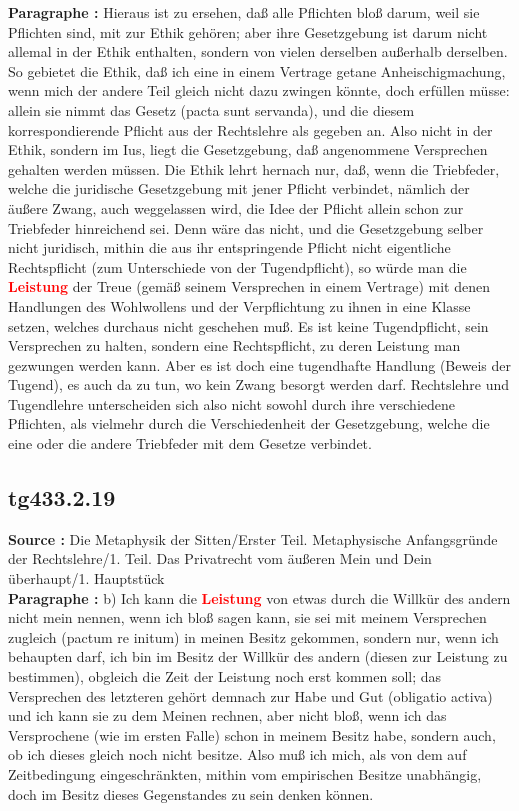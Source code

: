 \documentclass[a4paper,12pt,twoside]{book}
\newcommand{\match}[1]{\textcolor{red}{\textbf{#1}}}
\begin{document}
	\textbf{Paragraphe : }Hieraus ist zu ersehen, daß alle Pflichten bloß darum, weil sie Pflichten sind, mit zur Ethik gehören; aber ihre Gesetzgebung ist darum nicht allemal in der Ethik enthalten, sondern von vielen derselben außerhalb derselben. So gebietet die Ethik, daß ich eine in einem Vertrage getane Anheischigmachung, wenn mich der andere Teil gleich nicht dazu zwingen könnte, doch erfüllen müsse: allein sie nimmt das Gesetz (pacta sunt servanda), und die diesem korrespondierende Pflicht aus der Rechtslehre als gegeben an. Also nicht in der Ethik, sondern im Ius, liegt die Gesetzgebung, daß angenommene Versprechen gehalten werden müssen. Die Ethik lehrt hernach nur, daß, wenn die Triebfeder, welche die juridische Gesetzgebung mit jener Pflicht verbindet, nämlich der äußere Zwang, auch weggelassen wird, die Idee der Pflicht allein schon zur Triebfeder hinreichend sei. Denn wäre das nicht, und die Gesetzgebung selber nicht juridisch, mithin die aus ihr entspringende Pflicht nicht eigentliche Rechtspflicht (zum Unterschiede von der Tugendpflicht), so würde man die \match{Leistung} der Treue (gemäß seinem Versprechen in einem Vertrage) mit denen Handlungen des Wohlwollens und der Verpflichtung zu ihnen in eine Klasse setzen, welches durchaus nicht geschehen muß. Es ist keine Tugendpflicht, sein Versprechen zu halten, sondern eine Rechtspflicht, zu deren Leistung man gezwungen werden kann. Aber es ist doch eine tugendhafte Handlung (Beweis der Tugend), es auch da zu tun, wo kein Zwang besorgt werden darf. Rechtslehre und Tugendlehre unterscheiden sich also nicht sowohl durch ihre verschiedene Pflichten, als vielmehr durch die Verschiedenheit der Gesetzgebung, welche die eine oder die andere Triebfeder mit dem Gesetze verbindet. 
	
	\subsection*{tg433.2.19} 
	\textbf{Source : }Die Metaphysik der Sitten/Erster Teil. Metaphysische Anfangsgründe der Rechtslehre/1. Teil. Das Privatrecht vom äußeren Mein und Dein überhaupt/1. Hauptstück\\  
	
	\textbf{Paragraphe : }b) Ich kann die \match{Leistung} von etwas durch die Willkür des andern nicht mein nennen, wenn ich bloß sagen kann, sie sei mit meinem Versprechen zugleich (pactum re initum) in meinen Besitz gekommen, sondern nur, wenn ich behaupten darf, ich bin im Besitz der Willkür des andern (diesen zur Leistung zu bestimmen), obgleich die Zeit der Leistung noch erst kommen soll; das Versprechen des letzteren gehört demnach zur Habe und Gut (obligatio activa) und ich kann sie zu dem Meinen rechnen, aber nicht bloß, wenn ich das Versprochene (wie im ersten Falle) schon in meinem Besitz habe, sondern auch, ob ich dieses gleich noch nicht besitze. Also muß ich mich, als von dem auf Zeitbedingung eingeschränkten, mithin vom empirischen Besitze unabhängig, doch im Besitz dieses Gegenstandes zu sein denken können. 
	
\end{document}
